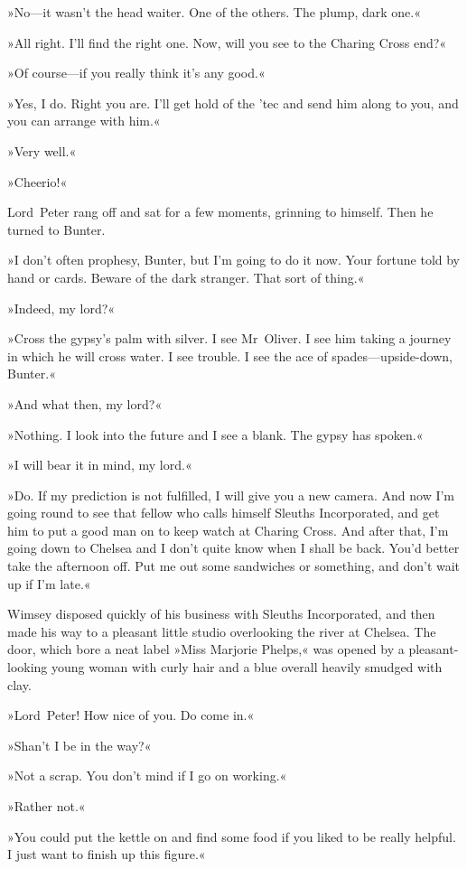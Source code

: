 »No—it wasn't the head waiter. One of the others. The plump, dark one.«

»All right. I'll find the right one. Now, will you see to the Charing Cross end?«

»Of course—if you really think it's any good.«

»Yes, I do. Right you are. I'll get hold of the 'tec and send him along to you, and you can arrange with him.«

»Very well.«

»Cheerio!«

Lord~Peter rang off and sat for a few moments, grinning to himself. Then he turned to Bunter.

»I don't often prophesy, Bunter, but I'm going to do it now. Your fortune told by hand or cards. Beware of the dark stranger. That sort of thing.«

»Indeed, my lord?«

»Cross the gypsy's palm with silver. I see Mr~Oliver. I see him taking a journey in which he will cross water. I see trouble. I see the ace of spades—upside-down, Bunter.«

»And what then, my lord?«

»Nothing. I look into the future and I see a blank. The gypsy has spoken.«

»I will bear it in mind, my lord.«

»Do. If my prediction is not fulfilled, I will give you a new camera. And now I'm going round to see that fellow who calls himself Sleuths Incorporated, and get him to put a good man on to keep watch at Charing Cross. And after that, I'm going down to Chelsea and I don't quite know when I shall be back. You'd better take the afternoon off. Put me out some sandwiches or something, and don't wait up if I'm late.«

Wimsey disposed quickly of his business with Sleuths Incorporated, and then made his way to a pleasant little studio overlooking the river at Chelsea. The door, which bore a neat label »Miss Marjorie Phelps,« was opened by a pleasant-looking young woman with curly hair and a blue overall heavily smudged with clay.

»Lord~Peter! How nice of you. Do come in.«

»Shan't I be in the way?«

»Not a scrap. You don't mind if I go on working.«

»Rather not.«

»You could put the kettle on and find some food if you liked to be really helpful. I just want to finish up this figure.«

